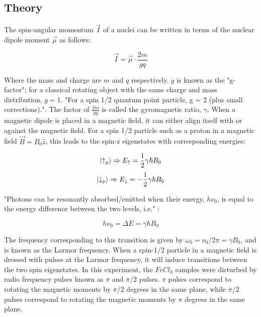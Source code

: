 \documentclass[a4paper, 12pt]{article}  %
\begin{document}



\subsection{Theory}\label{Theory}
The spin-angular momentum $\Vec{I}$ of a nuclei can be written in terms of the nuclear dipole moment $\Vec{\mu}$ as follows:

\begin{equation}\label{angular momentum}
    \Vec{I} = \Vec{\mu} \cdot \frac{2m}{g q}
\end{equation}

Where the mass and charge are $m$ and $q$ respectively. $g$ is known as the "g-factor"; for a classical rotating object with the same charge and mass distribution, $g = 1$. "For a spin 1/2 quantum point particle, g = 2 (plus small corrections)."\cite{Lab Manual}. The factor of $\frac{2m}{g q}$ is called the gyromagnetic ratio, $\gamma$. When a magnetic dipole is placed in a magnetic field, it can either align itself with or against the magnetic field. For a spin 1/2 particle such as a proton in a magnetic field $\Vec{B} = B_0 \hat{z}$, this leads to the spin-z eigenstates with corresponding energies:

\begin{equation*}\label{spin eigenstates}
\ket{\uparrow_p} \Rightarrow E_{\uparrow} = \frac{1}{2} \gamma \hbar B_0 
\end{equation*}
\begin{equation*}
    \ket{\downarrow_p} \Rightarrow E_{\downarrow} = -\frac{1}{2} \gamma \hbar B_0 
\end{equation*}

"Photons can be resonantly absorbed/emitted when their energy, $h \nu_0$, is equal to the energy difference between the two levels, i.e." \cite{Lab Manual}:

\begin{equation*}
    h \nu_0 = \Delta E = \gamma \hbar B_0
\end{equation*}

The frequency corresponding to this transition is given by $\omega_0 = \nu_0 / 2\pi = \gamma B_0$, and is known as the Larmor frequency. When a spin-1/2 particle in a magnetic field is dressed with pulses at the Larmor frequency, it will induce transitions between the two spin eigenstates. In this experiment, the $FeCl_3$ samples were disturbed by radio frequency pulses known as $\pi$ and $\pi/2$ pulses. $\pi$ pulses correspond to rotating the magnetic moments by $\pi/2$ degrees in the same plane, while $\pi/2$ pulses correspond to rotating the magnetic moments by $\pi$ degrees in the same plane. 
\newline
\end{document}
